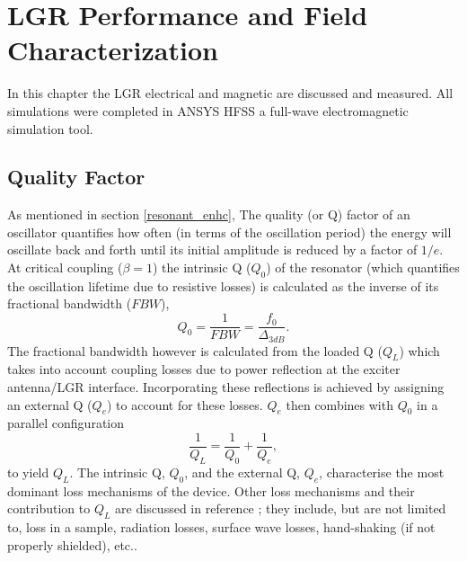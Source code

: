 
\chapter{LGR Performance and Field Characterization} \label{ch3}

In this chapter the LGR electrical and magnetic are discussed and measured. All simulations were completed in ANSYS HFSS a full-wave electromagnetic simulation tool. 

\section{Quality Factor}\label{quality}

As mentioned in section \ref{resonant_enhc}, The quality (or Q) factor of an oscillator quantifies how often (in terms of the oscillation period) the energy will oscillate back and forth until its initial amplitude is reduced by a factor of $1/e$. At critical coupling ($\beta = 1$) the intrinsic Q ($Q_0$) of the resonator (which quantifies the oscillation lifetime due to resistive losses) is calculated as the inverse of its fractional bandwidth ($FBW$),
\begin{equation}
Q_0 = \frac{1}{FBW} = \frac{f_0}{\Delta_{3dB}}.
\end{equation} 
The fractional bandwidth however is calculated from the loaded Q ($Q_L$) which takes into account coupling losses due to power reflection at the exciter antenna/LGR interface. Incorporating these reflections is achieved by assigning an external Q ($Q_e$) to account for these losses. $Q_e$ then combines with $Q_0$ in a parallel configuration
\begin{equation}
\frac{1}{Q_L} = \frac{1}{Q_0} + \frac{1}{Q_e},
\end{equation} 
to yield $Q_L$. The intrinsic Q, $Q_0$, and the external Q, $Q_e$, characterise the most dominant loss mechanisms of the device. Other loss mechanisms and their contribution to $Q_L$ are discussed in reference \cite{piasecki1993field}; they include, but are not limited to, loss in a sample, radiation losses, surface wave losses, hand-shaking (if not properly shielded), etc..

